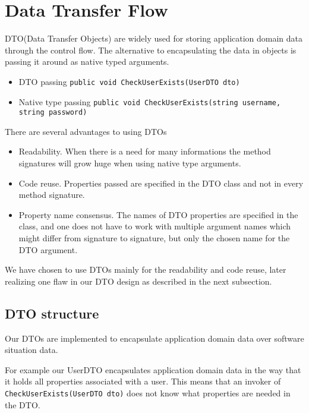 \documentclass[../report.tex]{subfiles}
\begin{document}
\section{Data Transfer Flow}

DTO(Data Transfer Objects) are widely used for storing application domain data through the control flow. The alternative to encapsulating the data in objects is passing it around as native typed arguments.

\begin{itemize}
\item DTO passing
\subitem \texttt{public void CheckUserExists(UserDTO dto)}

\item Native type passing
\subitem \texttt{public void CheckUserExists(string username, string password)}
\end{itemize}

There are several advantages to using DTOs

\begin{itemize}
\item Readability. When there is a need for many informations the method signatures will grow huge when using native type arguments.
\item Code reuse. Properties passed are specified in the DTO class and not in every method signature.
\item Property name consensus. The names of DTO properties are specified in the class, and one does not have to work with multiple argument names which might differ from signature to signature, but only the chosen name for the DTO argument.
\end{itemize}

We have chosen to use DTOs mainly for the readability and code reuse, later realizing one flaw in our DTO design as described in the next subsection.


\subsection{DTO structure}

Our DTOs are implemented to encapsulate application domain data over software situation data.

For example our UserDTO encapsulates application domain data in the way that it holds all properties associated with a user. This means that an invoker of \texttt{CheckUserExists(UserDTO dto)} does not know what properties are needed in the DTO.
\end{document}
